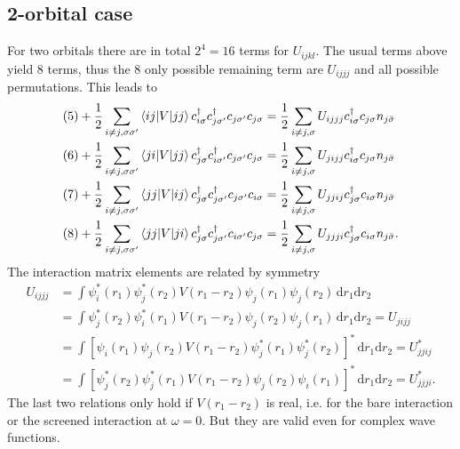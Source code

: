 \documentclass[12pt,a4paper]{scrartcl}
\numberwithin{equation}{section}
\begin{document}
\subsection{2-orbital case}
For two orbitals there are in total $2^4=16$ terms for $U_{ijkl}$. The usual terms above yield $8$ terms, 
thus the $8$ only possible remaining term are $U_{ijjj}$ and all possible permutations.
This leads to
\begin{align}
 &(5) +\frac{1}{2}\sum_{i\neq j,\sigma\sigma'} \braket{ij|V|jj} c^{\dagger}_{i\sigma} c^{\dagger}_{j\sigma'} c_{j\sigma'} c_{j\sigma} 
   =\frac{1}{2}\sum_{i\neq j,\sigma} U_{ijjj} c^{\dagger}_{i\sigma}  c_{j\sigma} n_{j\bar{\sigma}} \\
%
 &(6) + \frac{1}{2}\sum_{i\neq j,\sigma\sigma'} \braket{ji|V|jj} c^{\dagger}_{j\sigma} c^{\dagger}_{i\sigma'} c_{j\sigma'} c_{j\sigma} 
   =\frac{1}{2}\sum_{i\neq j,\sigma} U_{jijj} c^{\dagger}_{i\sigma}  c_{j\sigma} n_{j\bar{\sigma}} \\
%
 &(7) + \frac{1}{2}\sum_{i\neq j,\sigma\sigma'} \braket{jj|V|ij} c^{\dagger}_{j\sigma} c^{\dagger}_{j\sigma'} c_{j\sigma'} c_{i\sigma} 
   =\frac{1}{2}\sum_{i\neq j,\sigma} U_{jjij} c^{\dagger}_{j\sigma} c_{i\sigma}  n_{j\bar{\sigma}} \\
%
 &(8) + \frac{1}{2}\sum_{i\neq j,\sigma\sigma'} \braket{jj|V|ji} c^{\dagger}_{j\sigma} c^{\dagger}_{j\sigma'} c_{i\sigma'} c_{j\sigma} 
   =\frac{1}{2}\sum_{i\neq j,\sigma} U_{jjji} c^{\dagger}_{j\sigma} c_{i\sigma}  n_{j\bar{\sigma}} .
\end{align}
The interaction matrix elements are related by symmetry
\begin{align}
 U_{ijjj}
 &= \int \psi^*_i(r_1) \psi^*_j(r_2) V(r_1-r_2) \psi_j(r_1) \psi_j(r_2) \, \mathrm{d}r_1\mathrm{d}r_2 \\
 &= \int \psi^*_j(r_2) \psi^*_i(r_1) V(r_1-r_2) \psi_j(r_2) \psi_j(r_1) \, \mathrm{d}r_1\mathrm{d}r_2 = U_{jijj}\\
 &= \int \left[ \psi_i(r_1) \psi_j(r_2) V(r_1-r_2) \psi^*_j(r_1) \psi^*_j(r_2) \right]^* \, \mathrm{d}r_1\mathrm{d}r_2 = U^*_{jjij}\\
 &= \int \left[ \psi^*_j(r_2) \psi^*_j(r_1) V(r_1-r_2)  \psi_j(r_2) \psi_i(r_1)\right]^* \, \mathrm{d}r_1\mathrm{d}r_2 = U^*_{jjji} .
\end{align}
The last two relations only hold if $V(r_1-r_2)$ is real, i.e. for the bare interaction or the screened interaction at $\omega=0$. But they are valid even for complex wave functions.
\end{document}
